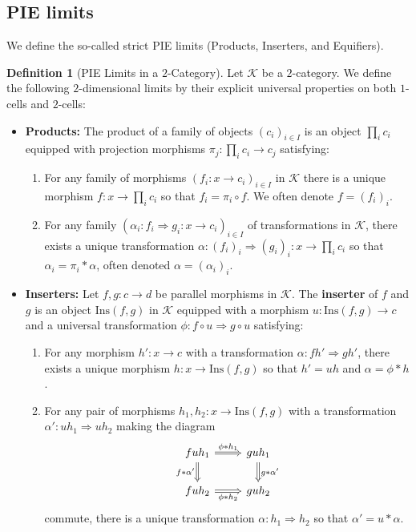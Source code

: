 \documentclass[11pt]{article}
\theoremstyle{plain}
\theoremstyle{definition}
\newtheorem{definition}[theorem]{Definition}
\numberwithin{equation}{section}
\newcommand{\K}{\mathcal{K}}
\newcommand{\Ins}{\mathrm{Ins}}
\begin{document}
\subsection{PIE limits}
We define the so-called strict PIE limits (Products, Inserters, and Equifiers).
\begin{definition}[PIE Limits in a $2$-Category]
   Let $\K$ be a $2$-category. We define the following $2$-dimensional limits by their explicit universal properties on both $1$-cells and $2$-cells:
   \begin{itemize}
       \item \textbf{Products:} The product of a family of objects $(c_i)_{i \in I}$ is an object $\prod_i c_i$ equipped with projection morphisms $\pi_j \colon \prod_i c_i \to c_j$ satisfying:
       \begin{enumerate}[label=(\roman*)]
           \item For any family of morphisms $(f_i\colon x\to c_i)_{i\in I}$ in $\K$ there is a unique morphism $f\colon x\to \prod_i c_i$ so that $f_i = \pi_i\circ f$. We often denote $f = (f_i)_i$.
           \item For any family $(\alpha_i\colon f_i\Rightarrow g_i\colon x\to c_i)_{i\in I}$ of transformations in $\K$, there exists a unique transformation $\alpha\colon (f_i)_i\Rightarrow  (g_i)_i\colon x\to \prod_i c_i$ so that $\alpha_i = \pi_i* \alpha$, often denoted $\alpha = (\alpha_i)_i$. 
       \end{enumerate}
       
       \item \textbf{Inserters:} Let $f,g\colon c\to d$ be parallel morphisms in $\K$. The \textbf{inserter} of $f$ and $g$ is an object $\Ins(f,g)$ in $\K$ equipped with a morphism $u\colon\Ins(f,g) \to c$ and a universal transformation $\phi \colon f \circ u \Rightarrow g \circ u$ satisfying:
       \begin{enumerate}[label=(\roman*)]
           \item For any morphism $h'\colon x\to c$ with a transformation $\alpha\colon fh'\Rightarrow gh'$, there exists a unique morphism $h\colon x\to \Ins(f,g)$ so that $h' = uh$ and $\alpha = \phi*h$. 
           \item For any pair of morphisms $h_1,h_2\colon x\to \Ins(f,g)$ with a transformation $\alpha'\colon uh_1\Rightarrow uh_2$ making the diagram 
           $$
           \begin{tikzcd}
fuh_1 \arrow[d, "f*\alpha'"', Rightarrow] \arrow[r, "\phi*h_1", Rightarrow] & guh_1 \arrow[d, "g*\alpha'", Rightarrow] \\
fuh_2 \arrow[r, "\phi*h_2"', Rightarrow]                                   & guh_2                                  
\end{tikzcd}
           $$
           commute, there is a unique transformation $\alpha\colon h_1\Rightarrow h_2$ so that $\alpha' = u*\alpha$.
       \end{enumerate}
       

\end{itemize}
\end{definition}
\end{document}
